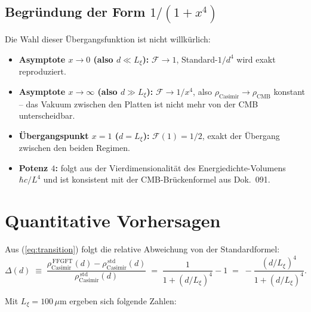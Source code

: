 \subsection{Begründung der Form $1/(1+x^4)$}

Die Wahl dieser Übergangsfunktion ist nicht willkürlich:
\begin{itemize}[leftmargin=2em,itemsep=2pt,topsep=2pt]
  \item \textbf{Asymptote $x \to 0$ (also $d \ll L_\xi$):}
        $\mathcal{F} \to 1$, Standard-$1/d^4$ wird exakt reproduziert.
  \item \textbf{Asymptote $x \to \infty$ (also $d \gg L_\xi$):}
        $\mathcal{F} \to 1/x^4$, also $\rho_\text{Casimir} \to
        \rho_\text{CMB}$ konstant -- das Vakuum zwischen den Platten
        ist nicht mehr von der CMB unterscheidbar.
  \item \textbf{Übergangspunkt $x = 1$ ($d = L_\xi$):}
        $\mathcal{F}(1) = 1/2$, exakt der Übergang zwischen den
        beiden Regimen.
  \item \textbf{Potenz $4$:} folgt aus der Vierdimensionalität des
        Energiedichte-Volumens $\hbar c/L^4$ und ist konsistent mit
        der CMB-Brückenformel aus Dok.~091.
\end{itemize}

\section{Quantitative Vorhersagen}
\label{sec:zahlen}

Aus (\ref{eq:transition}) folgt die relative Abweichung von der
Standardformel:
\begin{equation}
  \Delta(d) \;\equiv\; \frac{\rho_\text{Casimir}^{\,\text{FFGFT}}(d)
                              - \rho_\text{Casimir}^{\,\text{std}}(d)}
                            {\rho_\text{Casimir}^{\,\text{std}}(d)}
  \;=\; \frac{1}{1 + (d/L_\xi)^4} - 1
  \;=\; -\frac{(d/L_\xi)^4}{1 + (d/L_\xi)^4}.
  \label{eq:delta}
\end{equation}

Mit $L_\xi = 100\,\mu$m ergeben sich folgende Zahlen:

